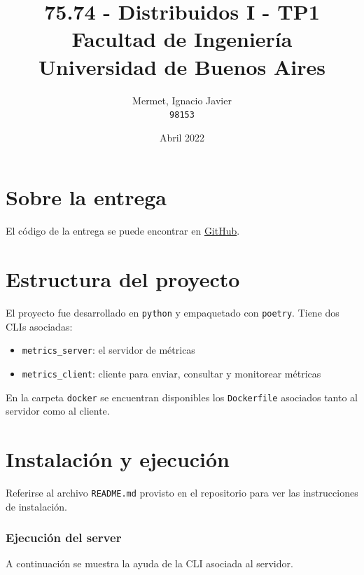 \documentclass[a4paper,oneside]{article}
\title{75.74 \-- Distribuidos I \-- TP1\\Facultad de Ingeniería\\Universidad de Buenos Aires}
\author{Mermet, Ignacio Javier\\\texttt{98153}}
\date{Abril 2022}
\begin{document}
\maketitle

\newpage

\tableofcontents

\newpage

\section{Sobre la entrega}
El código de la entrega se puede encontrar en \href{https://github.com/CrossNox/7574-TP1}{GitHub}.

\section{Estructura del proyecto}
El proyecto fue desarrollado en \texttt{python}\cite{Python} y empaquetado con \texttt{poetry}\cite{PythonPoetry}. Tiene dos CLIs asociadas:

\begin{itemize}
	\item \texttt{metrics\_server}: el servidor de métricas
	\item \texttt{metrics\_client}: cliente para enviar, consultar y monitorear métricas
\end{itemize}

En la carpeta \texttt{docker} se encuentran disponibles los \texttt{Dockerfile} asociados tanto al servidor como al cliente.

\section{Instalación y ejecución}
Referirse al archivo \texttt{README.md} provisto en el repositorio para ver las instrucciones de instalación.

\subsubsection{Ejecución del server}

A continuación se muestra la ayuda de la CLI asociada al servidor.
\end{document}

